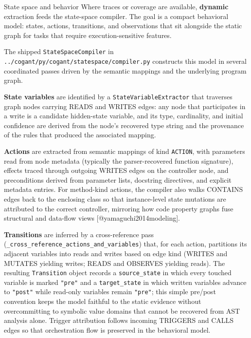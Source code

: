 \documentclass[
  ignorenonframetext,
]{beamer}
\begin{document}
\begin{frame}[fragile]{State space and behavior}
\protect{}\label{state-space-and-behavior}
Where traces or coverage are available, \textbf{dynamic} extraction
feeds the state-space compiler. The goal is a compact behavioral model:
states, actions, transitions, and observations that sit alongside the
static graph for tasks that require execution-sensitive features.

The shipped \texttt{StateSpaceCompiler} in
\texttt{../cogant/py/cogant/statespace/compiler.py} constructs this
model in several coordinated passes driven by the semantic mappings and
the underlying program graph.

\textbf{State variables} are identified by a
\texttt{StateVariableExtractor} that traverses graph nodes carrying
READS and WRITES edges: any node that participates in a write is a
candidate hidden-state variable, and its type, cardinality, and initial
confidence are derived from the node's recovered type string and the
provenance of the rules that produced the associated mapping.

\textbf{Actions} are extracted from semantic mappings of kind
\texttt{ACTION}, with parameters read from node metadata (typically the
parser-recovered function signature), effects traced through outgoing
WRITES edges on the controller node, and preconditions derived from
parameter lists, docstring directives, and explicit metadata entries.
For method-kind actions, the compiler also walks CONTAINS edges back to
the enclosing class so that instance-level state mutations are
attributed to the correct controller, mirroring how code property graphs
fuse structural and data-flow views {[}@yamaguchi2014modeling{]}.

\textbf{Transitions} are inferred by a cross-reference pass
(\texttt{\_cross\_reference\_actions\_and\_variables}) that, for each
action, partitions its adjacent variables into reads and writes based on
edge kind (WRITES and MUTATES yielding writes; READS and OBSERVES
yielding reads). The resulting \texttt{Transition} object records a
\texttt{source\_state} in which every touched variable is marked
\texttt{"pre"} and a \texttt{target\_state} in which written variables
advance to \texttt{"post"} while read-only variables remain
\texttt{"pre"}; this simple pre/post convention keeps the model faithful
to the static evidence without overcommitting to symbolic value domains
that cannot be recovered from AST analysis alone. Trigger attribution
follows incoming TRIGGERS and CALLS edges so that orchestration flow is
preserved in the behavioral model.


\end{frame}
\end{document}
